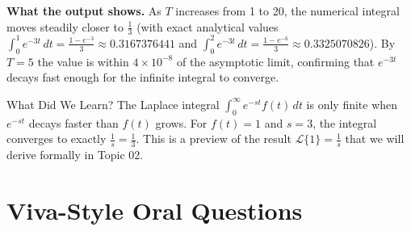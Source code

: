 \documentclass[12pt,a4paper]{article}
\begin{document}
\textbf{What the output shows.}  As $T$ increases from 1 to 20, the numerical
integral moves steadily closer to $\frac{1}{3}$ (with exact analytical values
$\int_0^1 e^{-3t}\,dt = \frac{1-e^{-3}}{3} \approx 0.3167376441$ and
$\int_0^2 e^{-3t}\,dt = \frac{1-e^{-6}}{3} \approx 0.3325070826$).  By $T = 5$ the value is
within $4 \times 10^{-8}$ of the asymptotic limit, confirming that $e^{-3t}$ decays fast enough
for the infinite integral to converge.

\begin{learnbox}{What Did We Learn?}
The Laplace integral $\int_0^\infty e^{-st}f(t)\,dt$ is only finite when
$e^{-st}$ decays faster than $f(t)$ grows.  For $f(t)=1$ and $s=3$, the
integral converges to exactly $\frac{1}{s} = \frac{1}{3}$.  This is a preview
of the result $\mathcal{L}\{1\} = \frac{1}{s}$ that we will derive formally in
Topic 02.
\end{learnbox}

\section{Viva-Style Oral Questions}
\end{document}
